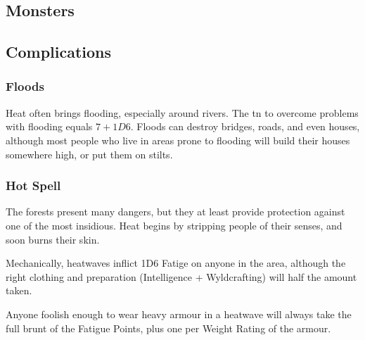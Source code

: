 \begin{multicols}{2}
\subsection{Monsters}
\label{monsterEncounters}

\encMonsters

\subsection{Complications}

\subsubsection{Floods}

Heat often brings flooding, especially around rivers.
The \gls{tn} to overcome problems with flooding equals $7 + 1D6$.
Floods can destroy bridges, roads, and even houses, although most people who live in areas prone to flooding will build their houses somewhere high, or put them on stilts.

\subsubsection{Hot Spell}

The forests present many dangers, but they at least provide protection against one of the most insidious.
Heat begins by stripping people of their senses, and soon burns their skin.

Mechanically, heatwaves inflict 1D6 Fatige on anyone in the area, although the right clothing and preparation (Intelligence + Wyldcrafting) will half the amount taken.

Anyone foolish enough to wear heavy armour in a heatwave will always take the full brunt of the Fatigue Points, plus one per Weight Rating of the armour.


\end{multicols}
